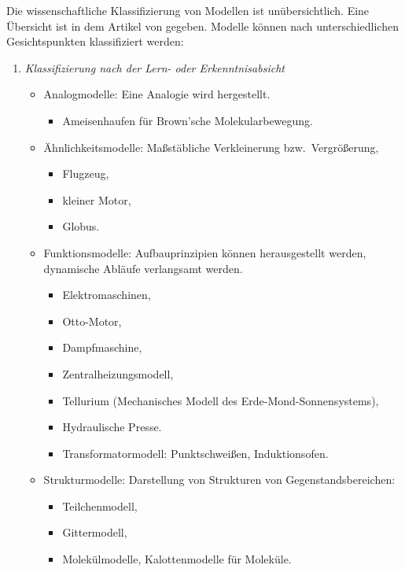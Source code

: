 \mip
Die wissenschaftliche Klassifizierung von Modellen ist un\"{u}bersichtlich. Eine \"{U}bersicht ist in dem Artikel von \textcite{MichelskisSeifertThieleWünscher} gegeben. Modelle k\"{o}nnen nach unterschiedlichen Gesichtspunkten klassifiziert werden:

\begin{enumerate}
\item{\it{Klassifizierung nach der Lern- oder Erkenntnisabsicht}}
\begin{itemize}
\item
Analogmodelle: Eine Analogie wird hergestellt.
\begin{itemize}
\item Ameisenhaufen f\"{u}r Brown'sche Molekularbewegung.
\end{itemize}

\item
\"{A}hnlichkeitsmodelle: Ma{\ss}st\"{a}bliche Verkleinerung bzw.\ Vergr\"{o}{\ss}erung,
\begin{itemize}
\item Flugzeug,
\item kleiner Motor,
\item Globus.
\end{itemize}

\item
Funktionsmodelle:  Aufbauprinzipien k\"{o}nnen herausgestellt
werden, dynamische Abl\"{a}ufe verlangsamt werden.
\begin{itemize}
\item Elektromaschinen,
\item Otto-Motor,
\item Dampfmaschine,
\item Zentralheizungsmodell,
\item Tellurium (Mechanisches Modell des Erde-Mond-Sonnensystems),
\item Hydraulische Presse.
\item Transformatormodell: Punktschwei{\ss}en, Induktionsofen.
\end{itemize}

\item
Strukturmodelle:
Darstellung von Strukturen von Gegenstandsbereichen:
\begin{itemize}
\item Teilchenmodell,
\item Gittermodell,
\item Molek\"{u}lmodelle, Kalottenmodelle f\"{u}r Molek\"{u}le.
\end{itemize}


\end{itemize}
\end{enumerate}
